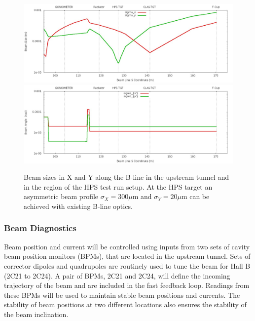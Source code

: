   \begin{figure}[t]
\includegraphics[scale=0.35]{beamline/hps2014_beamsize.jpg}
\includegraphics[scale=0.35]{beamline/hps2014_beamangle.jpg}
\caption{\small{Beam sizes in X and Y along the B-line in the upstream tunnel and in the region of the HPS test run setup. At the HPS target an 
asymmetric beam profile $\sigma_X=300 \mu$m and $\sigma_Y=20 \mu$m can be achieved with existing B-line optics.}}\label{fig:hps2014}
\end{figure}


 
 \subsubsection{Beam Diagnostics}
 \label{setup:beam_dignostics}
 
Beam position and current will be controlled using inputs from two sets of cavity beam position monitors (BPMs), that are located in the 
upstream tunnel. 
Sets of corrector dipoles and quadrupoles are routinely used to tune the beam for Hall B (2C21 to 2C24). A pair of BPMs, 2C21 and 2C24, 
will define the incoming trajectory of the beam and are included in the fast feedback loop. Readings from these BPMs will be used to 
maintain stable beam positions and currents. The stability of beam positions at two different locations also ensures the stability of the 
beam inclination.
 
